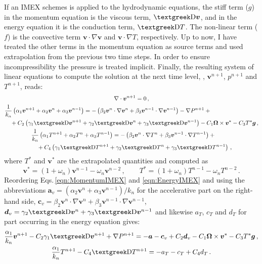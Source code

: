 If an IMEX schemes is applied to the hydrodynamic equations, the stiff term ($g$) in the momentum equation is the viscous term, $\laplace\bm{v}$, and in the energy equation it is the conduction term, $\laplace T$. The non-linear  term ($f$) is the convective term $\bm{v}\cdot\nabla\bm{v}$ and $\bm{v}\cdot\nabla T$, respectively. Up to now, I have treated the other terms in the momentum equation as source terms and used extrapolation from the previous two time steps. In order to ensure incompressibility the pressure is treated implicit. Finally, the resulting system of linear equations to compute the solution at the next time level, \ie, $\bm{v}^{n+1}$, $p^{n+1}$ and $T^{n+1}$, reads:
\begin{gather}
	\nabla\cdot\bm{v}^{n+1}=0\,,\\
	\begin{multlined}[c]
		\frac{1}{k_n}\left(\alpha_1 \bm{v}^{n+1}+ \alpha_2 \bm{v}^{n}+\alpha_3 \bm{v}^{n-1}\right)=-\left(\beta_2\bm{v}^{n}\cdot\nabla\bm{v}^{n}+\beta_3\bm{v}^{n-1}\cdot\nabla\bm{v}^{n-1}\right)-\nabla P^{n+1}+{}\\
		+C_2\left(\gamma_1\laplace\bm{v}^{n+1}+\gamma_2\laplace\bm{v}^{n}+\gamma_3\laplace\bm{v}^{n-1}\right)-C_1\bm{\Omega}\times\bm{v}^*-C_3T^*\bm{g}\,,
	\end{multlined}\label{eqn:MomentumIMEX}\\
	\begin{multlined}[c]
		\frac{1}{k_n}\left(\alpha_1 T^{n+1}+ \alpha_2 T^{n}+\alpha_3 T^{n-1}\right)=-\left(\beta_2\bm{v}^{n}\cdot\nabla T^{n}+\beta_3\bm{v}^{n-1}\cdot\nabla T^{n-1}\right)+{}\\
		+C_4\left(\gamma_1\laplace T^{n+1}+\gamma_2\laplace T^{n}+\gamma_3\laplace T^{n-1}\right)\,,
	\end{multlined}\label{eqn:EnergyIMEX}
\end{gather}
where $T^*$ and $\bm{v}^*$ are the extrapolated quantities and computed as
\begin{equation}
	\bm{v}^*=\left(1+\omega_n\right)\bm{v}^{n-1}-\omega_n\bm{v}^{n-2}\,,\qquad
	T^*=\left(1+\omega_n\right)T^{n-1}-\omega_nT^{n-2}\,.
\end{equation}
Reordering Eqs.\,\eqref{eqn:MomentumIMEX} and \eqref{eqn:EnergyIMEX} and using the abbreviations $\bm{a}_v=(\alpha_2 \bm{v}^{n}+\alpha_3 \bm{v}^{n-1})/k_n$ for the accelerative part on the right-hand side, $\bm{c}_v=\beta_2\bm{v}^{n}\cdot\nabla\bm{v}^{n}+\beta_3\bm{v}^{n-1}\cdot\nabla\bm{v}^{n-1}$, $\bm{d}_v=\gamma_2\laplace\bm{v}^{n}+\gamma_3\laplace\bm{v}^{n-1}$ and likewise $a_T$, $c_T$ and $d_T$ for part occurring in the energy equation gives:
\begin{gather}
	\frac{\alpha_1}{k_n}\bm{v}^{n+1}-C_2\gamma_1\laplace\bm{v}^{n+1}+\nabla P^{n+1}=-\bm{a}-\bm{c}_v+C_2\bm{d}_v-C_1\bm{\Omega}\times\bm{v}^*-C_3T^*\bm{g}\,,\label{eqn:MomentumIMEXReorder}\\
	\frac{\alpha_1}{k_n}T^{n+1}-C_4\laplace T^{n+1}=-a_T-c_T+C_4d_T\,.
	\label{eqn:EnergyIMEXReorder}
\end{gather}

